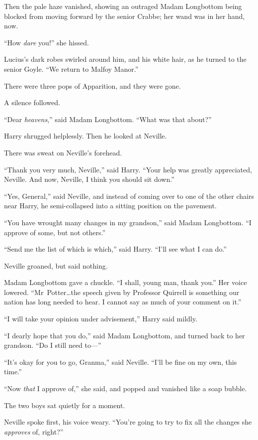 Then the pale haze vanished, showing an outraged Madam Longbottom being blocked from moving forward by the senior Crabbe; her wand was in her hand, now.

“How \emph{dare} you!” she hissed.

Lucius’s dark robes swirled around him, and his white hair, as he turned to the senior Goyle. “We return to Malfoy Manor.”

There were three pops of Apparition, and they were gone.

A silence followed.

“Dear \emph{heavens},” said Madam Longbottom. “What was that about?”

Harry shrugged helplessly. Then he looked at Neville.

There was sweat on Neville’s forehead.

“Thank you very much, Neville,” said Harry. “Your help was greatly appreciated, Neville. And now, Neville, I think you should sit down.”

“Yes, General,” said Neville, and instead of coming over to one of the other chairs near Harry, he semi-collapsed into a sitting position on the pavement.

“You have wrought many changes in my grandson,” said Madam Longbottom. “I approve of some, but not others.”

“Send me the list of which is which,” said Harry. “I’ll see what I can do.”

Neville groaned, but said nothing.

Madam Longbottom gave a chuckle. “I shall, young man, thank you.” Her voice lowered. “Mr~Potter…the speech given by Professor Quirrell is something our nation has long needed to hear. I cannot say as much of your comment on it.”

“I will take your opinion under advisement,” Harry said mildly.

“I dearly hope that you do,” said Madam Longbottom, and turned back to her grandson. “Do I still need to—”

“It’s okay for you to go, Granma,” said Neville. “I’ll be fine on my own, this time.”

“Now \emph{that} I approve of,” she said, and popped and vanished like a soap bubble.

The two boys sat quietly for a moment.

Neville spoke first, his voice weary. “You’re going to try to fix all the changes she \emph{approves} of, right?”

